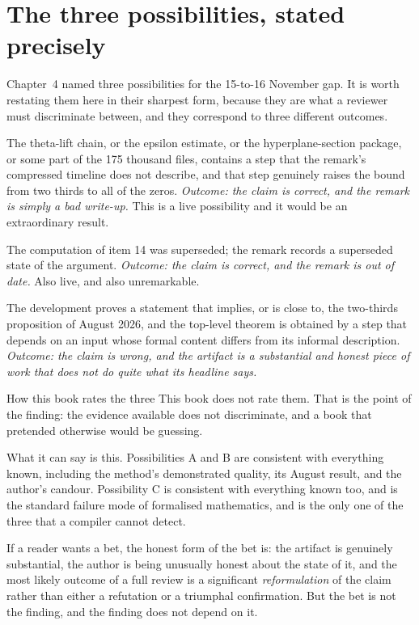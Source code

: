 \section{The three possibilities, stated precisely}Chapter~4 named three possibilities for the 15-to-16 November gap. It is worth
restating them here in their sharpest form, because they are what a reviewer
must discriminate between, and they correspond to three different outcomes.

\begin{description}[style=nextline,leftmargin=0pt,labelwidth=0pt,labelsep=0pt,font=\sffamily\bfseries\small,
  itemsep=6pt]
\item[\textbf{A. The artifact contains the missing ingredient.}] The theta-lift
chain, or the epsilon estimate, or the hyperplane-section package, or some
part of the 175 thousand files, contains a step that the remark's compressed
timeline does not describe, and that step genuinely raises the bound from two
thirds to all of the zeros. \emph{Outcome: the claim is correct, and the
remark is simply a bad write-up.} This is a live possibility and it would be
an extraordinary result.

\item[\textbf{B. The ceiling was a cost accounting the author later
improved.}] The computation of item 14 was superseded; the remark records a
superseded state of the argument. \emph{Outcome: the claim is correct, and
the remark is out of date.} Also live, and also unremarkable.

\item[\textbf{C. The formal theorem is weaker than the headline.}] The
development proves a statement that implies, or is close to, the two-thirds
proposition of August 2026, and the top-level theorem is obtained by a step
that depends on an input whose formal content differs from its informal
description. \emph{Outcome: the claim is wrong, and the artifact is a
substantial and honest piece of work that does not do quite what its headline
says.}
\end{description}

\begin{seamnote}{How this book rates the three}
This book does not rate them. That is the point of the finding: the evidence
available does not discriminate, and a book that pretended otherwise would be
guessing.

What it can say is this. Possibilities A and B are consistent with everything
known, including the method's demonstrated quality, its August result, and the
author's candour. Possibility C is consistent with everything known too, and
is the standard failure mode of formalised mathematics, and is the only one of
the three that a compiler cannot detect.

If a reader wants a bet, the honest form of the bet is: the artifact is
genuinely substantial, the author is being unusually honest about the state of
it, and the most likely outcome of a full review is a significant
\emph{reformulation} of the claim rather than either a refutation or a
triumphal confirmation. But the bet is not the finding, and the finding does
not depend on it.
\end{seamnote}

